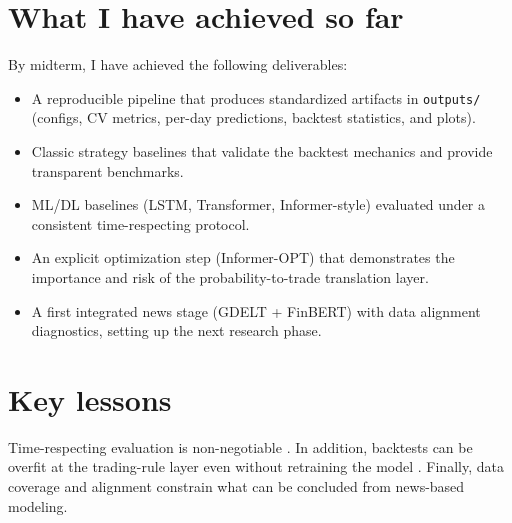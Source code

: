 \documentclass[12pt,a4paper,oneside]{report}
\begin{document}
\section{What I have achieved so far}
By midterm, I have achieved the following deliverables:
\begin{itemize}
  \item A reproducible pipeline that produces standardized artifacts in \texttt{outputs/} (configs, CV metrics, per-day predictions, backtest statistics, and plots).
  \item Classic strategy baselines that validate the backtest mechanics and provide transparent benchmarks.
  \item ML/DL baselines (LSTM, Transformer, Informer-style) evaluated under a consistent time-respecting protocol.
  \item An explicit optimization step (Informer-OPT) that demonstrates the importance and risk of the probability-to-trade translation layer.
  \item A first integrated news stage (GDELT + FinBERT) with data alignment diagnostics, setting up the next research phase.
\end{itemize}

\section{Key lessons}
Time-respecting evaluation is non-negotiable \citep{bergmeir2018}. In addition, backtests can be overfit at the trading-rule layer even without retraining the model \citep{bailey2014,lopezdeprado2018}. Finally, data coverage and alignment constrain what can be concluded from news-based modeling.
\end{document}
